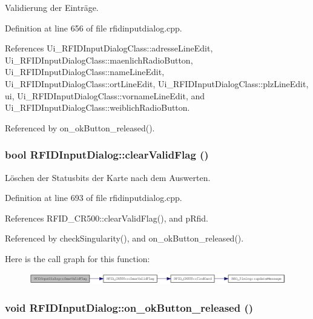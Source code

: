 Validierung der Einträge. 



Definition at line 656 of file rfidinputdialog.cpp.

References Ui\_\-RFIDInputDialogClass::adresseLineEdit, Ui\_\-RFIDInputDialogClass::maenlichRadioButton, Ui\_\-RFIDInputDialogClass::nameLineEdit, Ui\_\-RFIDInputDialogClass::ortLineEdit, Ui\_\-RFIDInputDialogClass::plzLineEdit, ui, Ui\_\-RFIDInputDialogClass::vornameLineEdit, and Ui\_\-RFIDInputDialogClass::weiblichRadioButton.

Referenced by on\_\-okButton\_\-released().\hypertarget{class_r_f_i_d_input_dialog_a466a7c7bb57d2c3163ce2d400b9f6af}{
\subsubsection[clearValidFlag]{\setlength{\rightskip}{0pt plus 5cm}bool RFIDInputDialog::clearValidFlag ()}}
\label{class_r_f_i_d_input_dialog_a466a7c7bb57d2c3163ce2d400b9f6af}


Löschen der Statusbits der Karte nach dem Auswerten. 



Definition at line 693 of file rfidinputdialog.cpp.

References RFID\_\-CR500::clearValidFlag(), and pRfid.

Referenced by checkSingularity(), and on\_\-okButton\_\-released().

Here is the call graph for this function:\nopagebreak
\begin{figure}[H]
\begin{center}
\leavevmode
\includegraphics[width=353pt]{class_r_f_i_d_input_dialog_a466a7c7bb57d2c3163ce2d400b9f6af_cgraph}
\end{center}
\end{figure}
\hypertarget{class_r_f_i_d_input_dialog_bfc414e920d8c099a56c253ec07a6fa7}{
\subsubsection[on\_\-okButton\_\-released]{\setlength{\rightskip}{0pt plus 5cm}void RFIDInputDialog::on\_\-okButton\_\-released ()}}
\label{class_r_f_i_d_input_dialog_bfc414e920d8c099a56c253ec07a6fa7}


